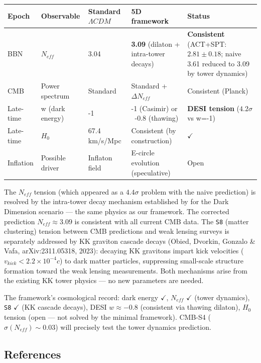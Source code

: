 \documentclass[aps,prd,preprint,superscriptaddress,longbibliography,floatfix]{revtex4-2}
\theoremstyle{remark}
\begin{document}
\begin{table}[H]
\begin{ruledtabular}
\begin{tabular}{p{3.0cm}p{3.0cm}p{3.0cm}p{3.0cm}p{3.0cm}}
Epoch & Observable & Standard $\Lambda CDM$ & 5D framework & Status \\
\hline
BBN & $N_{eff}$ & 3.04 & \textbf{3.09} (dilaton + intra-tower decays) & \textbf{Consistent} (ACT+SPT: $2.81\pm0.18$; naive 3.61 reduced to 3.09 by tower dynamics) \\
CMB & Power spectrum & Standard & Standard + $\Delta N_{eff}$ & Consistent (Planck) \\
Late-time & w (dark energy) & -1 & -1 (Casimir) or ~-0.8 (thawing) & \textbf{DESI tension} ($4.2\sigma$ vs w=-1) \\
Late-time & $H_{0}$ & 67.4 km/s/Mpc & Consistent (by construction) & $\checkmark$ \\
Inflation & Possible driver & Inflaton field & E-circle evolution (speculative) & Open \\
\end{tabular}
\end{ruledtabular}
\end{table}

The $N_{eff}$ tension (which appeared as a $4.4\sigma$ problem with the naive prediction) is resolved by the intra-tower decay mechanism established by \cite{GonzaloNeutrinoTowers2024} for the Dark Dimension scenario --- the same physics as our framework. The corrected prediction $N_{eff} \approx 3.09$ is consistent with all current CMB data. The \texttt{S8} (matter clustering) tension between CMB predictions and weak lensing surveys is separately addressed by KK graviton cascade decays (Obied, Dvorkin, Gonzalo \& Vafa, arXiv:2311.05318, 2023): decaying KK gravitons impart kick velocities ($v_{kick} < 2.2 \times 10^{-4} c$) to dark matter particles, suppressing small-scale structure formation toward the weak lensing measurements. Both mechanisms arise from the existing KK tower physics --- no new parameters are needed.

The framework's cosmological record: dark energy $\checkmark$, $N_{eff}$ $\checkmark$ (tower dynamics), \texttt{S8} $\checkmark$ (KK cascade decays), DESI $w \approx -0.8$ (consistent via thawing dilaton), $H_{0}$ tension (open --- not solved by the minimal framework). CMB-S4 ($\sigma(N_{eff}) \sim  0.03$) will precisely test the tower dynamics prediction.



\subsection{References}
\end{document}
